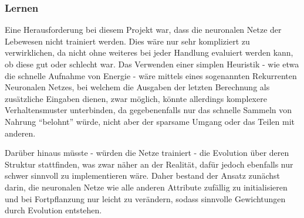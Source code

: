 \documentclass[course=erap]{aspdoc}
\begin{document}

\subsubsection{Lernen}
Eine Herausforderung bei diesem Projekt war, dass die neuronalen Netze der Lebewesen nicht trainiert werden. Dies wäre nur sehr kompliziert zu verwirklichen, da nicht ohne weiteres bei jeder Handlung evaluiert werden kann, ob diese gut oder schlecht war. Das Verwenden einer simplen Heuristik - wie etwa die schnelle Aufnahme von Energie - wäre mittels eines sogenannten Rekurrenten Neuronalen Netzes, bei welchem die Ausgaben der letzten Berechnung als zusätzliche Eingaben dienen, zwar möglich, könnte allerdings komplexere Verhaltensmuster unterbinden, da gegebenenfalls nur das schnelle Sammeln von Nahrung "`belohnt"' würde, nicht aber der sparsame Umgang oder das Teilen mit anderen.

Darüber hinaus müsste - würden die Netze trainiert - die Evolution über deren Struktur stattfinden, was zwar näher an der Realität, dafür jedoch ebenfalls nur schwer sinnvoll zu implementieren wäre.
Daher bestand der Ansatz zunächst darin, die neuronalen Netze wie alle anderen Attribute zufällig zu initialisieren und bei Fortpflanzung nur leicht zu verändern, sodass sinnvolle Gewichtungen durch Evolution entstehen.
\end{document}

